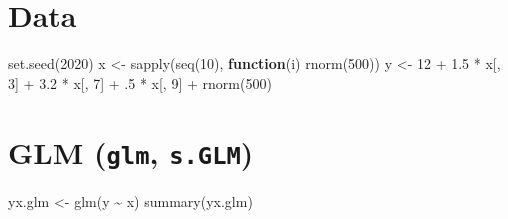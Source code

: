 \documentclass[
]{book}
\newenvironment{Shaded}{\begin{snugshade}}{\end{snugshade}}
\newcommand{\ControlFlowTok}[1]{\textcolor[rgb]{0.13,0.29,0.53}{\textbf{#1}}}
\newcommand{\DecValTok}[1]{\textcolor[rgb]{0.00,0.00,0.81}{#1}}
\newcommand{\FloatTok}[1]{\textcolor[rgb]{0.00,0.00,0.81}{#1}}
\newcommand{\FunctionTok}[1]{\textcolor[rgb]{0.00,0.00,0.00}{#1}}
\newcommand{\NormalTok}[1]{#1}
\newcommand{\OtherTok}[1]{\textcolor[rgb]{0.56,0.35,0.01}{#1}}
\newcommand{\SpecialCharTok}[1]{\textcolor[rgb]{0.00,0.00,0.00}{#1}}
\begin{document}
\hypertarget{data}{%
\section{Data}\label{data}}

\begin{Shaded}
\begin{Highlighting}[]
\FunctionTok{set.seed}\NormalTok{(}\DecValTok{2020}\NormalTok{)}
\NormalTok{x }\OtherTok{\textless{}{-}} \FunctionTok{sapply}\NormalTok{(}\FunctionTok{seq}\NormalTok{(}\DecValTok{10}\NormalTok{), }\ControlFlowTok{function}\NormalTok{(i) }\FunctionTok{rnorm}\NormalTok{(}\DecValTok{500}\NormalTok{))}
\NormalTok{y }\OtherTok{\textless{}{-}} \DecValTok{12} \SpecialCharTok{+} \FloatTok{1.5} \SpecialCharTok{*}\NormalTok{ x[, }\DecValTok{3}\NormalTok{] }\SpecialCharTok{+} \FloatTok{3.2} \SpecialCharTok{*}\NormalTok{ x[, }\DecValTok{7}\NormalTok{] }\SpecialCharTok{+}\NormalTok{ .}\DecValTok{5} \SpecialCharTok{*}\NormalTok{ x[, }\DecValTok{9}\NormalTok{] }\SpecialCharTok{+} \FunctionTok{rnorm}\NormalTok{(}\DecValTok{500}\NormalTok{)}
\end{Highlighting}
\end{Shaded}

\hypertarget{glm-glm-s.glm}{%
\section{\texorpdfstring{GLM (\texttt{glm}, \texttt{s.GLM})}{GLM (glm, s.GLM)}}\label{glm-glm-s.glm}}

\begin{Shaded}
\begin{Highlighting}[]
\NormalTok{yx.glm }\OtherTok{\textless{}{-}} \FunctionTok{glm}\NormalTok{(y }\SpecialCharTok{\textasciitilde{}}\NormalTok{ x)}
\FunctionTok{summary}\NormalTok{(yx.glm)}
\end{Highlighting}
\end{Shaded}
\end{document}
